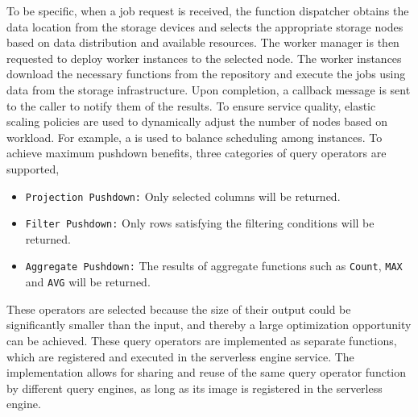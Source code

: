 To be specific, when a job request is received, the function dispatcher obtains the data location from the storage devices and selects the appropriate storage nodes based on data distribution and available resources. The worker manager is then requested to deploy worker instances to the selected node. The worker instances download the necessary functions from the repository and execute the jobs using data from the storage infrastructure. Upon completion, a callback message is sent to the caller to notify them of the results. To ensure service quality, elastic scaling policies are used to dynamically adjust the number of nodes based on workload. 
For example, a  is used to balance scheduling among instances.
To achieve maximum pushdown benefits, three categories of query operators are supported, 

\begin{itemize}

\item \texttt{Projection Pushdown:}  Only selected columns will be returned.

\item \texttt{Filter Pushdown:} Only rows satisfying the filtering conditions will be returned.

\item \texttt{Aggregate  Pushdown:} The results of aggregate functions such as \texttt{Count}, \texttt{MAX} and \texttt{AVG} will be returned.

\end{itemize}

These operators are selected because the size of their output could be significantly smaller than the input, and thereby a large optimization opportunity can be achieved.
These query operators are implemented as separate functions, which are registered and executed in the serverless engine service. The implementation allows for sharing and reuse of the same query operator function by different query engines, as long as its image is registered in the serverless engine.



